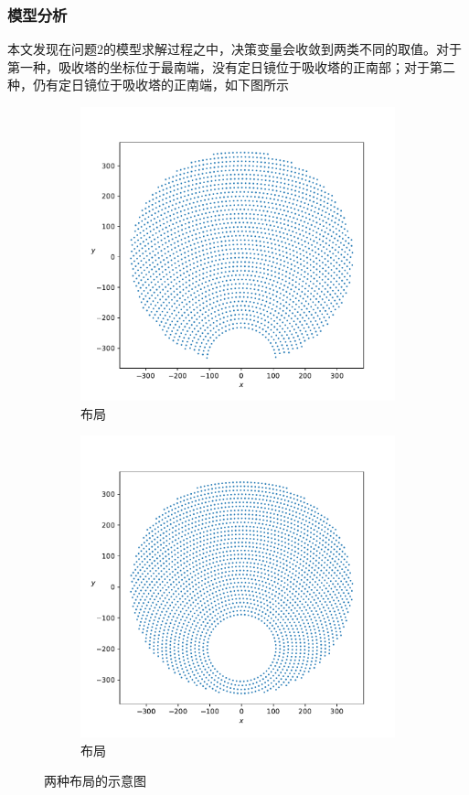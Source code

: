 \subsubsection{模型分析}
本文发现在问题2的模型求解过程之中，决策变量会收敛到两类不同的取值。对于第一种，吸收塔的坐标位于最南端，没有定日镜位于吸收塔的正南部；对于第二种，仍有定日镜位于吸收塔的正南端，如下图所示
\begin{figure}[H]
\centering
\begin{subfigure}[b]{0.4\textwidth}
\centering
\includegraphics[scale = 0.3]{north_field.pdf}
\caption{ 布局}
\end{subfigure}
\begin{subfigure}[b]{0.4\textwidth}
\centering
\includegraphics[scale = 0.3]{circular.pdf}
\caption{ 布局}
\end{subfigure}
\caption{两种布局的示意图}
\end{figure}
